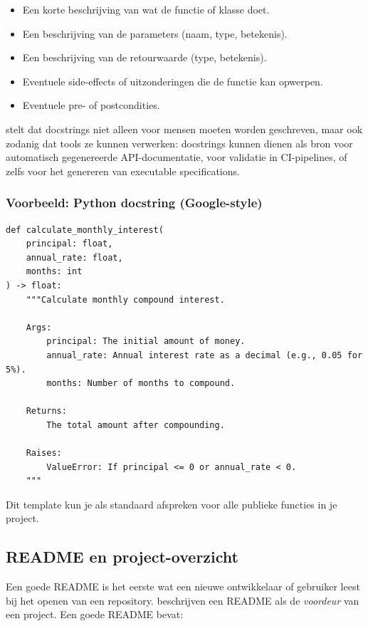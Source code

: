\begin{itemize}
    \item Een korte beschrijving van wat de functie of klasse doet.
    \item Een beschrijving van de parameters (naam, type, betekenis).
    \item Een beschrijving van de retourwaarde (type, betekenis).
    \item Eventuele side-effects of uitzonderingen die de functie kan opwerpen.
    \item Eventuele pre- of postcondities.
\end{itemize}

\textcite{martraire2019livingdocumentation} stelt dat docstrings niet alleen voor mensen moeten worden geschreven, maar ook zodanig dat tools ze kunnen verwerken: docstrings kunnen dienen als bron voor automatisch gegenereerde API-documentatie, voor validatie in CI-pipelines, of zelfs voor het genereren van executable specifications.

\subsubsection{Voorbeeld: Python docstring (Google-style)}
\begin{verbatim}
def calculate_monthly_interest(
    principal: float,
    annual_rate: float,
    months: int
) -> float:
    """Calculate monthly compound interest.

    Args:
        principal: The initial amount of money.
        annual_rate: Annual interest rate as a decimal (e.g., 0.05 for 5%).
        months: Number of months to compound.

    Returns:
        The total amount after compounding.

    Raises:
        ValueError: If principal <= 0 or annual_rate < 0.
    """
\end{verbatim}

Dit template kun je als standaard afspreken voor alle publieke functies in je project.

\subsection{README en project-overzicht}
Een goede README is het eerste wat een nieuwe ontwikkelaar of gebruiker leest bij het openen van een repository. \textcite{bhatti2021docsdevelopers} beschrijven een README als de \textit{voordeur} van een project. Een goede README bevat:

